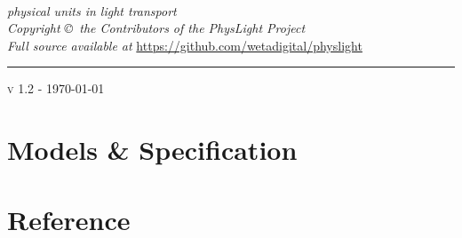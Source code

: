 \documentclass{physlight}
\def\physLightVersion{v 1.2 - \today}
\begin{document}
\begin{titlepage}
\begin{center}

{\fontsize{60}{72}\selectfont \physLight}\\[.3cm]

\textsf{\textit{\fontsize{24}{26.8}\selectfont physical units in light transport}}\\[1.5cm]

\vfill
\large
\textit{Copyright \copyright\ the Contributors of the PhysLight Project}\\[1mm]
\textit{Full source available at} \url{https://github.com/wetadigital/physlight}\\[1mm]

%

\hrule \vspace{1mm}
\textsc{\large \physLightVersion}\\[0.5cm]

\end{center}
\end{titlepage}

\tableofcontents
\listoffigures
\listoftables


\part{Models \& Specification}\label{part:models}






\part{Reference}\label{part:ref}
\end{document}
